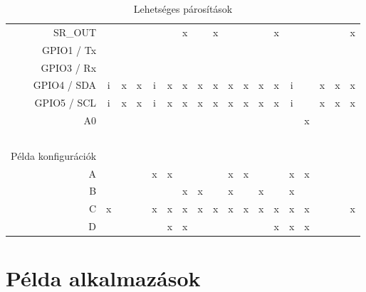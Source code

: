 {\begin{landscape}
\begin{table}[ht]
\begin{tabular}{r|ccccccccccccccccc}
                SR\_OUT                &   &   &   &   &   & x &   & x &   &   &   & x &   &   &   &   & x \\
                GPIO1 / Tx             &   &   &   &   &   &   &   &   &   &   &   &   &   &   &   &   &   \\
                GPIO3 / Rx             &   &   &   &   &   &   &   &   &   &   &   &   &   &   &   &   &   \\
                GPIO4 / SDA            & i & x & x & i & x & x & x & x & x & x & x & x & i &   & x & x & x \\
                GPIO5 / SCL            & i & x & x & i & x & x & x & x & x & x & x & x & i &   & x & x & x \\
                A0                     &   &   &   &   &   &   &   &   &   &   &   &   &   & x &   &   &   \\
                \hline
                \ &\\
                Példa konfigurációk \\
                A                      &   &   &   & x & x &   &   &   & x & x &   &   & x & x &   &   &   \\
                B                      &   &   &   &   &   & x & x &   & x &   & x &   & x &   &   &   &   \\
                C                      & x &   &   & x & x & x & x & x & x & x & x & x & x & x &   &   & x \\
                D                      &   &   &   &   & x & x &   &   &   &   &   & x & x & x &   &   &   \\
            \end{tabular}
            \caption{Lehetséges párosítások}
            \label{tab:applications}
        \end{table}
    \end{landscape}
    \clearpage%
}

\section{Példa alkalmazások}

